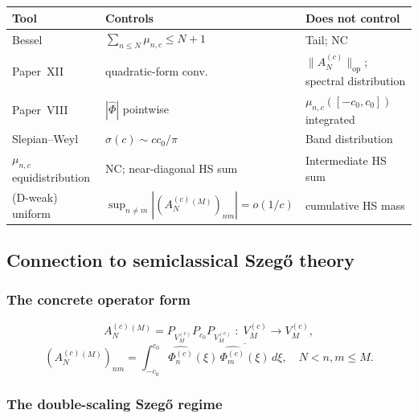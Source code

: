 \documentclass[12pt,a4paper]{amsart}
\theoremstyle{definition}
\theoremstyle{remark}
\newcommand{\norm}[1]{\|#1\|}
\newcommand{\Ac}{A_N^{(c)}}
\begin{document}
\begin{center}
\renewcommand{\arraystretch}{1.3}
\begin{tabular}{lll}
\toprule
Tool & Controls & Does not control \\
\midrule
Bessel
  & $\sum_{n\le N}\mu_{n,c}\le N+1$
  & Tail; NC \\
Paper~XII
  & quadratic-form conv.
  & $\norm{\Ac}_{\mathrm{op}}$;
    spectral distribution \\
Paper~VIII
  & $|\widehat{\Phi}|$ pointwise
  & $\mu_{n,c}([-c_0,c_0])$
    integrated \\
Slepian--Weyl
  & $\sigma(c)\sim cc_0/\pi$
  & Band distribution \\
$\mu_{n,c}$ equidistribution
  & NC; near-diagonal HS sum
  & Intermediate HS sum \\
(D-weak) uniform
  & $\sup_{n\ne m}
    |(\Ac^{(M)})_{nm}|=o(1/c)$
  & cumulative HS mass \\
\bottomrule
\end{tabular}
\end{center}

\subsection{Connection to semiclassical
  Szeg\H{o} theory}
\label{sec:szego}

\subsubsection*{The concrete operator form}

\begin{equation}\label{eq:AcM-concrete}
  \Ac^{(M)}
  = P_{V_M^{(c)}}P_{c_0}P_{V_M^{(c)}}
  \;:\; V_M^{(c)}\to V_M^{(c)},
\end{equation}
\begin{equation}\label{eq:gram}
  (\Ac^{(M)})_{nm}
  = \int_{-c_0}^{c_0}
    \widehat{\Phi_n^{(c)}}(\xi)\,
    \overline{\widehat{\Phi_m^{(c)}}(\xi)}
    \,d\xi,
  \quad N < n,m \le M.
\end{equation}

\subsubsection*{The double-scaling
  Szeg\H{o} regime}
\end{document}
